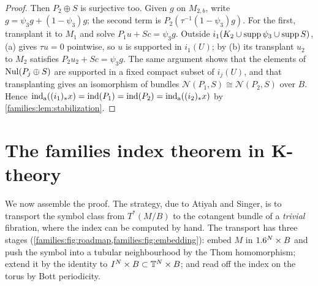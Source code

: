 \begin{proof}
  Then $P_2\oplus S$ is surjective too. Given $g$ on $M_{2,b}$, write
  $g=\psi_3g+(1-\psi_3)g$; the second term is $P_2(\tau^{-1}(1-\psi_3)g)$. For
  the first, transplant it to $M_1$ and solve $P_1u+Sc=\psi_3g$. Outside
  $i_1(K_2\cup\operatorname{supp}\psi_3\cup\operatorname{supp} S)$, (a) gives $\tau u=0$ pointwise, so $u$ is
  supported in $i_1(U)$; by (b) its transplant $u_2$ to $M_2$ satisfies
  $P_2u_2+Sc=\psi_3g$. The same argument shows that the elements of
  $\operatorname{Nul}(P_j\oplus S)$ are supported in a fixed compact subset of $i_j(U)$, and
  that transplanting gives an isomorphism of bundles
  $\mathcal N(P_1,S)\cong\mathcal N(P_2,S)$ over $B$. Hence
  $\operatorname{ind}_{\mathrm{a}}((i_1)_*x)=\operatorname{ind}(P_1)=\operatorname{ind}(P_2)=\operatorname{ind}_{\mathrm{a}}((i_2)_*x)$ by
  \cref{families:lem:stabilization}.
\end{proof}

\section{The families index theorem in K-theory}\label{families:sec:AS-K}

We now assemble the proof. The strategy, due to Atiyah and Singer, is to
transport the symbol class from $T^*(M/B)$ to the cotangent bundle of a
\emph{trivial} fibration, where the index can be computed by hand. The transport
has three stages (\cref{families:fig:roadmap,families:fig:embedding}): embed
$M$ in $1.6^N\times B$ and push the symbol into a tubular neighbourhood by the
Thom homomorphism; extend it by the identity to $I^N\times B\subset\mathbb{T}^N\times
B$; and read off the index on the torus by Bott periodicity.

